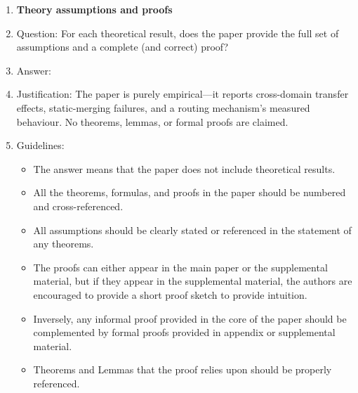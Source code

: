 \begin{enumerate}
\begin{itemize}
        \item While the authors might fear that complete honesty about limitations might be used by reviewers as grounds for rejection, a worse outcome might be that reviewers discover limitations that aren't acknowledged in the paper. The authors should use their best judgment and recognize that individual actions in favor of transparency play an important role in developing norms that preserve the integrity of the community. Reviewers will be specifically instructed to not penalize honesty concerning limitations.
    \end{itemize}

\item {\bf Theory assumptions and proofs}
    \item[] Question: For each theoretical result, does the paper provide the full set of assumptions and a complete (and correct) proof?
    \item[] Answer: \answerNA{}
    \item[] Justification: The paper is purely empirical---it reports cross-domain transfer effects, static-merging failures, and a routing mechanism's measured behaviour. No theorems, lemmas, or formal proofs are claimed.
    \item[] Guidelines:
    \begin{itemize}
        \item The answer \answerNA{} means that the paper does not include theoretical results. 
        \item All the theorems, formulas, and proofs in the paper should be numbered and cross-referenced.
        \item All assumptions should be clearly stated or referenced in the statement of any theorems.
        \item The proofs can either appear in the main paper or the supplemental material, but if they appear in the supplemental material, the authors are encouraged to provide a short proof sketch to provide intuition. 
        \item Inversely, any informal proof provided in the core of the paper should be complemented by formal proofs provided in appendix or supplemental material.
        \item Theorems and Lemmas that the proof relies upon should be properly referenced. 
    \end{itemize}


\end{enumerate}
